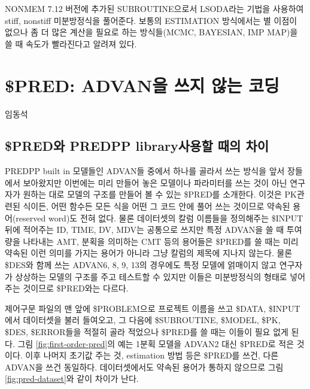 \documentclass[
  10pt,
  krantz2,
  a4paper]{krantz}
\theoremstyle{definition}
\theoremstyle{definition}
\theoremstyle{definition}
\theoremstyle{remark}
\begin{document}
NONMEM 7.12 버전에 추가된 SUBROUTINE으로서 LSODA라는 기법을 사용하여 stiff, nonstiff 미분방정식을 풀어준다. 보통의 ESTIMATION 방식에서는 별 이점이 없으나 좀 더 많은 계산을 필요로 하는 방식들(MCMC, BAYESIAN, IMP MAP)을 쓸 때 속도가 빨라진다고 알려져 있다.

\hypertarget{PRED}{%
\chapter{\$PRED: ADVAN을 쓰지 않는 코딩}\label{PRED}}

임동석

\hypertarget{preduxc640-predpp-libraryuxc0acuxc6a9uxd560-uxb54cuxc758-uxcc28uxc774}{%
\section{\$PRED와 PREDPP library사용할 때의 차이}\label{preduxc640-predpp-libraryuxc0acuxc6a9uxd560-uxb54cuxc758-uxcc28uxc774}}

PREDPP built in 모델들인 ADVAN들 중에서 하나를 골라서 쓰는 방식을 앞서 장들에서 보아왔지만 이번에는 미리 만들어 놓은 모델이나 파라미터를 쓰는 것이 아닌 연구자가 원하는 대로 모델의 구조를 만들어 볼 수 있는 \$PRED를 소개한다. 이것은 PK관련된 식이든, 어떤 함수든 모든 식을 어떤 그 코드 안에 풀어 쓰는 것이므로 약속된 용어(reserved word)도 전혀 없다. 물론 데이터셋의 칼럼 이름들을 정의해주는 \$INPUT 뒤에 적어주는 ID, TIME, DV, MDV는 공통으로 쓰지만 특정 ADVAN을 쓸 때 투여량을 나타내는 AMT, 분획을 의미하는 CMT 등의 용어들은 \$PRED를 쓸 때는 미리 약속된 이런 의미를 가지는 용어가 아니라 그냥 칼럼의 제목에 지나지 않는다. 물론 \$DES와 함께 쓰는 ADVAN6, 8, 9, 13의 경우에도 특정 모델에 얽매이지 않고 연구자가 상상하는 모델의 구조를 주고 테스트할 수 있지만 이들은 미분방정식의 형태로 넣어주는 것이므로 \$PRED와는 다르다.

제어구문 파일의 맨 앞에 \$PROBLEM으로 프로젝트 이름을 쓰고 \$DATA, \$INPUT에서 데이터셋을 불러 들여오고, 그 다음에 \$SUBROUTINE, \$MODEL, \$PK, \$DES, \$ERROR들을 적절히 골라 적었으나 \$PRED를 쓸 때는 이들이 필요 없게 된다. 그림 \ref{fig:first-order-pred}의 예는 1분획 모델을 ADVAN2 대신 \$PRED로 적은 것이다. 이후 나머지 초기값 주는 것, estimation 방법 등은 \$PRED를 쓰건, 다른 ADVAN을 쓰건 동일하다. 데이터셋에서도 약속된 용어가 통하지 않으므로 그림 \ref{fig:pred-dataset}와 같이 차이가 난다.
\end{document}
